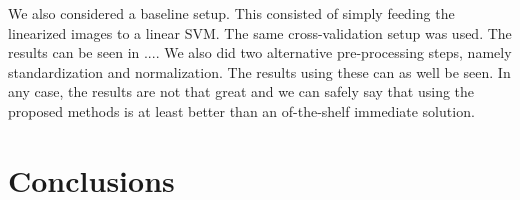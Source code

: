 \documentclass[12pt,a4paper,oneside,english]{UPBThesis}
\begin{document}
We also considered a baseline setup. This consisted of simply feeding the linearized images to a linear SVM. The same cross-validation setup was used. The results can be seen in .... We also did two alternative pre-processing steps, namely standardization and normalization. The results using these can as well be seen. In any case, the results are not that great and we can safely say that using the proposed methods is at least better than an of-the-shelf immediate solution.

\chapter{Conclusions}
\label{chap:Conclusions}




\appendix
\end{document}
